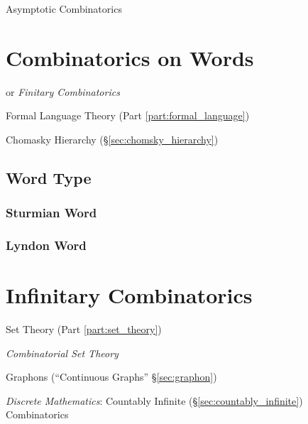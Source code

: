 Asymptotic Combinatorics



\section{Combinatorics on Words}\label{sec:combinatorics_on_words}

or \emph{Finitary Combinatorics}

Formal Language Theory (Part \ref{part:formal_language})

Chomasky Hierarchy (\S\ref{sec:chomsky_hierarchy})



\subsection{Word Type}\label{sec:word_type}

\subsubsection{Sturmian Word}\label{sec:sturmian_word}

\subsubsection{Lyndon Word}\label{sec:lyndon_word}



\section{Infinitary Combinatorics}\label{sec:infinitary_combinatorics}

Set Theory (Part \ref{part:set_theory})

\emph{Combinatorial Set Theory}

Graphons (``Continuous Graphs'' \S\ref{sec:graphon})

\emph{Discrete Mathematics}: Countably Infinite (\S\ref{sec:countably_infinite})
Combinatorics



